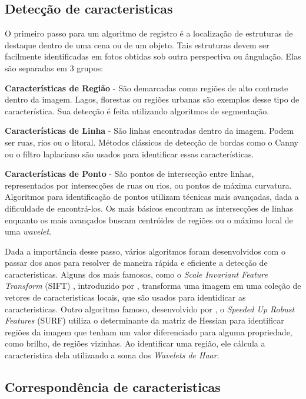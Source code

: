 \subsection{Detecção de caracteristicas}
\label{sec:dec_corr_carac}

    O primeiro passo para um algoritmo de registro é a localização de estruturas de destaque dentro de uma cena ou de
um objeto. Tais estruturas devem ser facilmente identificadas em fotos obtidas sob outra perspectiva ou ângulação. 
Elas são separadas em 3 grupos:

\textbf{Características de Região} - São demarcadas como regiões de alto contraste dentro da imagem. Lagos, florestas ou
regiões urbanas são exemplos desse tipo de característica. Sua detecção é feita utilizando algoritmos de segmentação.

\textbf{Características de Linha} - São linhas encontradas dentro da imagem. Podem ser ruas, rios ou o litoral. Métodos
clássicos de detecção de bordas como o Canny ou o filtro laplaciano são usados para identificar essas características.

\textbf{Características de Ponto} - São pontos de intersecção entre linhas, representados por intersecções de ruas ou
rios, ou pontos de máxima curvatura. Algoritmos para identificação de pontos utilizam técnicas mais avançadas, dada a 
dificuldade de encontrá-los. Os mais básicos encontram as intersecções de linhas enquanto os mais avançados buscam
centróides de regiões ou o máximo local de uma \textit{wavelet}.

    Dada a importância desse passo, vários algoritmos foram desenvolvidos com o passar dos anos para resolver de maneira
rápida e eficiente a detecção de caracteristicas. Alguns dos mais famosos, como o 
\textit{Scale Invariant Feature Transform} (SIFT) , introduzido por \cite{lowe1999object}, transforma uma imagem em uma 
coleção de vetores de caracteristicas locais, que são usados para identidicar as caracteristicas. Outro algoritmo famoso,
desenvolvido por \cite{bay2006surf}, o \textit{Speeded Up Robust Features} (SURF) utiliza o determinante da matriz de
Hessian para identificar regiões da imagem que tenham um valor diferenciado para alguma propriedade, como brilho, de 
regiões vizinhas. Ao identificar uma região, ele cálcula a caracteristica dela utilizando a soma dos 
\textit{Wavelets de Haar}.

\subsection{Correspondência de caracteristicas}

